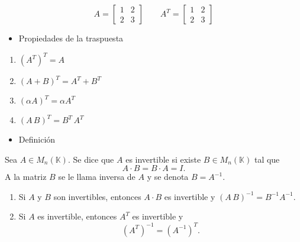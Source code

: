 \[ A=\begin{bmatrix}
	1 & 2\\
	2 & 3
\end{bmatrix}\qquad A^T=\begin{bmatrix}
1 & 2\\
2 & 3
\end{bmatrix} \]
\begin{itemize}[label=\color{red}\textbullet, leftmargin=*]
	\item \color{lightblue}Propiedades de la traspuesta
\end{itemize}
\begin{enumerate}[label=\color{lightblue}\arabic*)]
	\item $(A^T)^T=A$
	\item $(A+B)^T=A^T+B^T$
	\item $(\alpha A)^T=\alpha A^T$
	\item $(A\, B)^T=B^T\,A^T$
\end{enumerate}
\begin{itemize}[label=\color{red}\textbullet, leftmargin=*]
	\item \color{lightblue}Definición 
\end{itemize}
Sea $A\in M_n(\mathbb{K})$. Se dice que $A$ es invertible si existe $B\in M_n(\mathbb{K})$ tal que \[ A\cdot B=B\cdot A=I. \] A la matriz $B$ se le llama inversa de $A$ y se denota $B=A^{-1}$.

\begin{enumerate}[label=\color{lightblue}\arabic*)]
	\item Si $A$ y $B$ son invertibles, entonces $A\cdot B$ es invertible y $(A\, B)^{-1}=B^{-1}A^{-1}$.
	\item Si $A$ es invertible, entonces $A^T$ es invertible y \[ (A^T)^{-1}=(A^{-1})^T. \]
\end{enumerate}
